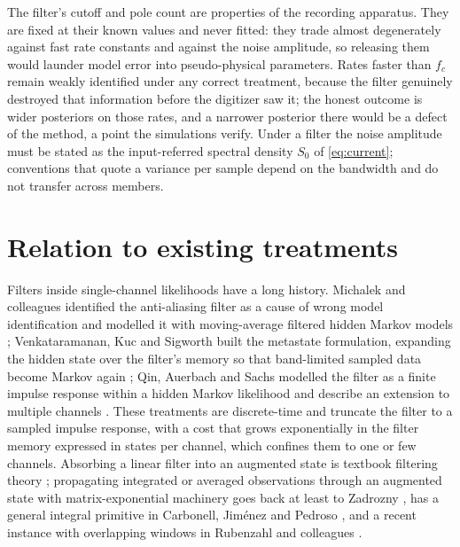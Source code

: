 \documentclass[11pt]{article}
\begin{document}
The filter's cutoff and pole count are properties of the recording
apparatus. They are fixed at their known values and never fitted: they
trade almost degenerately against fast rate constants and against the
noise amplitude, so releasing them would launder model error into
pseudo-physical parameters. Rates faster than $f_c$ remain weakly
identified under any correct treatment, because the filter genuinely
destroyed that information before the digitizer saw it; the honest
outcome is wider posteriors on those rates, and a narrower posterior
there would be a defect of the method, a point the simulations verify.
Under a filter the noise amplitude must be stated as the input-referred
spectral density $S_0$ of \eqref{eq:current}; conventions that quote a
variance per sample depend on the bandwidth and do not transfer across
members.

\section{Relation to existing treatments}

Filters inside single-channel likelihoods have a long history. Michalek
and colleagues identified the anti-aliasing filter as a cause of wrong
model identification and modelled it with moving-average filtered hidden
Markov models \cite{michalek1999}; Venkataramanan, Kuc and Sigworth built
the metastate formulation, expanding the hidden state over the filter's
memory so that band-limited sampled data become Markov again
\cite{venkataramanan2000}; Qin, Auerbach and Sachs modelled the filter as
a finite impulse response within a hidden Markov likelihood and describe
an extension to multiple channels \cite{qin2000}. These treatments are
discrete-time and truncate the filter to a sampled impulse response, with
a cost that grows exponentially in the filter memory expressed in states
per channel, which confines them to one or few channels. Absorbing a
linear filter into an augmented state is textbook filtering theory
\cite{jazwinski1970}; propagating integrated or averaged observations
through an augmented state with matrix-exponential machinery goes back at
least to Zadrozny \cite{zadrozny1988}, has a general integral primitive
in Carbonell, Jim\'enez and Pedroso \cite{carbonell2008}, and a recent
instance with overlapping windows in Rubenzahl and colleagues
\cite{rubenzahl2026}.
\end{document}
